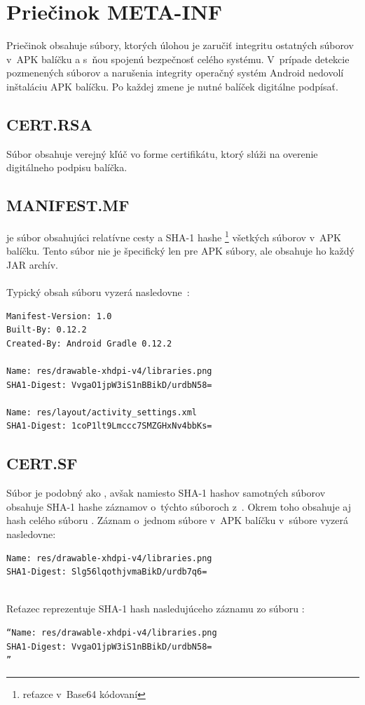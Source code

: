 \section{Priečinok META-INF}
\label{META-INF}
Priečinok  obsahuje súbory, ktorých úlohou je zaručiť integritu ostatných súborov v~APK balíčku a s~ňou spojenú bezpečnosť celého systému. V~prípade detekcie pozmenených súborov a narušenia integrity operačný systém Android nedovolí inštaláciu APK balíčku. Po každej zmene je nutné balíček digitálne podpísať.

\subsection*{CERT.RSA}
\label{CERT.RSA} 
Súbor  obsahuje verejný kľúč vo forme  certifikátu, ktorý slúži na overenie digitálneho podpisu balíčka.
\subsection*{MANIFEST.MF}
\label{MANIFEST.MF}
 je súbor obsahujúci relatívne cesty a SHA-1 hashe \footnote{reťazce v~Base64 kódovaní} všetkých súborov v~APK balíčku. Tento súbor nie je špecifický len pre APK súbory, ale obsahuje ho každý JAR archív.\\\\
Typický obsah súboru  vyzerá nasledovne~\cite{Yang2015}: \\
\begin{verbatim}
Manifest-Version: 1.0
Built-By: 0.12.2
Created-By: Android Gradle 0.12.2

Name: res/drawable-xhdpi-v4/libraries.png
SHA1-Digest: VvgaO1jpW3iS1nBBikD/urdbN58=

Name: res/layout/activity_settings.xml
SHA1-Digest: 1coP1lt9Lmccc7SMZGHxNv4bbKs=
\end{verbatim}
\subsection*{CERT.SF}
\label{CERT.SF}
Súbor  je podobný ako , avšak namiesto SHA-1 hashov samotných súborov obsahuje SHA-1 hashe záznamov o~týchto súboroch z~. Okrem toho obsahuje aj hash celého súboru . \newline Záznam o~jednom súbore v~APK balíčku v~súbore  vyzerá nasledovne: \newline
\begin{verbatim}
Name: res/drawable-xhdpi-v4/libraries.png
SHA1-Digest: Slg56lqothjvmaBikD/urdb7q6=
\end{verbatim}\mbox{}\\
Reťazec  reprezentuje SHA-1 hash nasledujúceho záznamu zo súboru :\mbox{}\\
\begin{verbatim}
“Name: res/drawable-xhdpi-v4/libraries.png
SHA1-Digest: VvgaO1jpW3iS1nBBikD/urdbN58=
”\end{verbatim}
